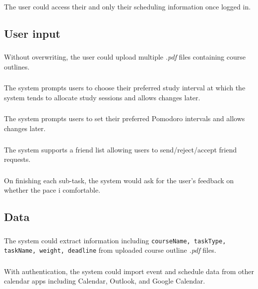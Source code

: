 \documentclass[12pt]{article}
\begin{document}
\subsubsection{}
The user could access their and only their scheduling information once logged in.


\subsection{User input}
\subsubsection{}
Without overwriting, the user could upload multiple \textit{.pdf} files containing course outlines.
\subsubsection{}
The system prompts users to choose their preferred study interval at which the system tends to allocate study sessions and allows changes later.
\subsubsection{}
The system prompts users to set their preferred Pomodoro intervals and allows changes later. 
\subsubsection{}
The system supports a friend list allowing users to send/reject/accept friend requests.
\subsubsection{}
On finishing each sub-task, the system would ask for the user's feedback on whether the pace i comfortable.

\subsection{Data}
\subsubsection{}
The system could extract information including \texttt{courseName, taskType, taskName, weight, deadline} from uploaded course outline \textit{.pdf} files.
\subsubsection{}
With authentication, the system could import event and schedule data from other calendar apps including Calendar, Outlook, and Google Calendar.
\end{document}
